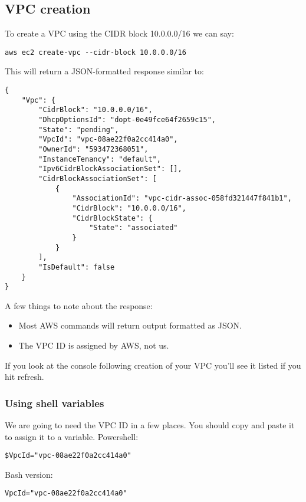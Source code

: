 \subsection{VPC creation}\label{vpc-creation}

To create a VPC using the CIDR block 10.0.0.0/16 we can say:

\begin{verbatim}
aws ec2 create-vpc --cidr-block 10.0.0.0/16
\end{verbatim}

This will return a JSON-formatted response similar to:

\begin{verbatim}
{
    "Vpc": {
        "CidrBlock": "10.0.0.0/16",
        "DhcpOptionsId": "dopt-0e49fce64f2659c15",
        "State": "pending",
        "VpcId": "vpc-08ae22f0a2cc414a0",
        "OwnerId": "593472368051",
        "InstanceTenancy": "default",
        "Ipv6CidrBlockAssociationSet": [],
        "CidrBlockAssociationSet": [
            {
                "AssociationId": "vpc-cidr-assoc-058fd321447f841b1",
                "CidrBlock": "10.0.0.0/16",
                "CidrBlockState": {
                    "State": "associated"
                }
            }
        ],
        "IsDefault": false
    }
}
\end{verbatim}

A few things to note about the response:

\begin{itemize}
\item
  Most AWS commands will return output formatted as JSON.
\item
  The VPC ID is assigned by AWS, not us.
\end{itemize}

If you look at the console following creation of your VPC you'll see it
listed if you hit refresh.

\subsubsection{Using shell variables}

We are going to need the VPC ID in a few places.
You should copy and paste it to assign it to a variable.
Powershell:

\begin{verbatim}
$VpcId="vpc-08ae22f0a2cc414a0"
\end{verbatim}

Bash version:
\begin{verbatim}
VpcId="vpc-08ae22f0a2cc414a0"
\end{verbatim}

